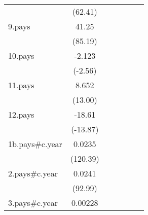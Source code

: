 {\begin{tabular}{l*{6}{c}}
                    &     (62.41)         &                     &                     &                     &                     &                     \\
[1em]
9.pays              &       41.25\sym{***}&                     &                     &                     &                     &                     \\
                    &     (85.19)         &                     &                     &                     &                     &                     \\
[1em]
10.pays             &      -2.123\sym{*}  &                     &                     &                     &                     &                     \\
                    &     (-2.56)         &                     &                     &                     &                     &                     \\
[1em]
11.pays             &       8.652\sym{***}&                     &                     &                     &                     &                     \\
                    &     (13.00)         &                     &                     &                     &                     &                     \\
[1em]
12.pays             &      -18.61\sym{***}&                     &                     &                     &                     &                     \\
                    &    (-13.87)         &                     &                     &                     &                     &                     \\
[1em]
1b.pays#c.year      &      0.0235\sym{***}&                     &                     &                     &                     &                     \\
                    &    (120.39)         &                     &                     &                     &                     &                     \\
[1em]
2.pays#c.year       &      0.0241\sym{***}&                     &                     &                     &                     &                     \\
                    &     (92.99)         &                     &                     &                     &                     &                     \\
[1em]
3.pays#c.year       &     0.00228\sym{***}&                     &                     &                     &                     &                     \\

\end{tabular}}

